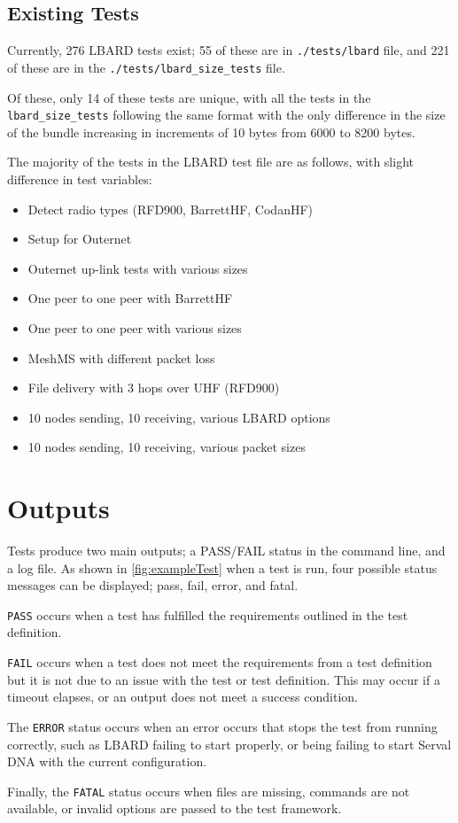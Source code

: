 \subsection{Existing Tests}
Currently, 276 LBARD tests exist; 55 of these are in \texttt{./tests/lbard} file, and 221 of these are in the \texttt{./tests/lbard\_size\_tests} file.

Of these, only 14 of these tests are unique, with all the tests in the \texttt{lbard\_size\_tests} following the same format with the only difference in the size of the bundle increasing in increments of 10 bytes from 6000 to 8200 bytes.

The majority of the tests in the LBARD test file are as follows, with slight difference in test variables:
\begin{itemize}
    \item Detect radio types (RFD900, BarrettHF, CodanHF)
    \item Setup for Outernet
    \item Outernet up-link tests with various sizes
    \item One peer to one peer with BarrettHF
    \item One peer to one peer with various sizes
    \item MeshMS with different packet loss
    \item File delivery with 3 hops over UHF (RFD900)
    \item 10 nodes sending, 10 receiving, various LBARD options
    \item 10 nodes sending, 10 receiving, various packet sizes
\end{itemize}


\section{Outputs}
Tests produce two main outputs; a PASS/FAIL status in the command line, and a log file.
As shown in \figurename{ \ref{fig:exampleTest}} when a test is run, four possible status messages can be displayed; pass, fail, error, and fatal.
\begin{list}{}{}
    \item \texttt{PASS} occurs when a test has fulfilled the requirements outlined in the test definition.

    \item \texttt{FAIL} occurs when a test does not meet the requirements from a test definition but it is not due to an issue with the test or test definition. This may occur if a timeout elapses, or an output does not meet a success condition.
    
    \item The \texttt{ERROR} status occurs when an error occurs that stops the test from running correctly, such as LBARD failing to start properly, or being failing to start Serval DNA with the current configuration.
    
    \item Finally, the \texttt{FATAL} status occurs when files are missing, commands are not available, or invalid options are passed to the test framework.
\end{list}


